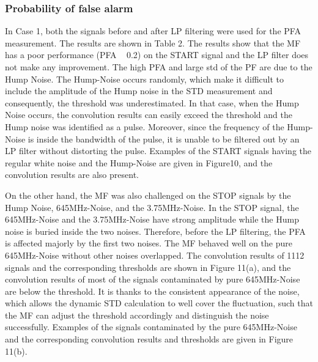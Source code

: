 \subsubsection{Probability of false alarm}
In Case 1, both the signals before and after LP filtering were used for the PFA measurement. The results are shown in Table 2. The results show that the MF has a poor performance (PFA ~ 0.2) on the START signal and the LP filter does not make any improvement. The high PFA and large std of the PF are due to the Hump Noise. The Hump-Noise occurs randomly, which make it difficult to include the amplitude of the Hump noise in the STD measurement and consequently, the threshold was underestimated. In that case, when the Hump Noise occurs, the convolution results can easily exceed the threshold and the Hump noise was identified as a pulse. Moreover, since the frequency of the Hump-Noise is inside the bandwidth of the pulse, it is unable to be filtered out by an LP filter without distorting the pulse. Examples of the START signals having the regular white noise and the Hump-Noise are given in Figure10, and the convolution results are also present.\par
On the other hand, the MF was also challenged on the STOP signals by the Hump Noise, 645MHz-Noise, and the 3.75MHz-Noise. In the STOP signal, the 645MHz-Noise and the 3.75MHz-Noise have strong amplitude while the Hump noise is buried inside the two noises. Therefore, before the LP filtering, the PFA is affected majorly by the first two noises. The MF behaved well on the pure 645MHz-Noise without other noises overlapped. The convolution results of 1112 signals and the corresponding thresholds are shown in Figure 11(a), and the convolution results of most of the signals contaminated by pure 645MHz-Noise are below the threshold. It is thanks to the consistent appearance of the noise, which allows the dynamic STD calculation to well cover the fluctuation, such that the MF can adjust the threshold accordingly and distinguish the noise successfully. Examples of the signals contaminated by the pure 645MHz-Noise and the corresponding convolution results and thresholds are given in Figure 11(b).
